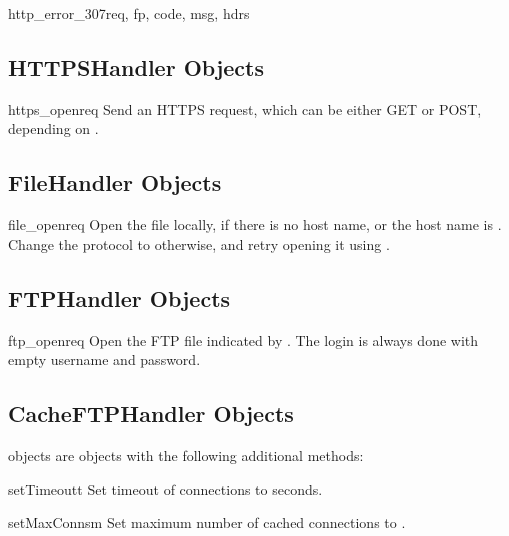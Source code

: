 \begin{methoddesc}[HTTPRedirectHandler]{http_error_307}{req,
                                                  fp, code, msg, hdrs}
\subsection{HTTPSHandler Objects \label{https-handler-objects}}

\begin{methoddesc}[HTTPSHandler]{https_open}{req}
Send an HTTPS request, which can be either GET or POST, depending on
.
\end{methoddesc}


\subsection{FileHandler Objects \label{file-handler-objects}}

\begin{methoddesc}[FileHandler]{file_open}{req}
Open the file locally, if there is no host name, or
the host name is . Change the
protocol to  otherwise, and retry opening
it using .
\end{methoddesc}


\subsection{FTPHandler Objects \label{ftp-handler-objects}}

\begin{methoddesc}[FTPHandler]{ftp_open}{req}
Open the FTP file indicated by .
The login is always done with empty username and password.
\end{methoddesc}


\subsection{CacheFTPHandler Objects \label{cacheftp-handler-objects}}

 objects are  objects with
the following additional methods:

\begin{methoddesc}[CacheFTPHandler]{setTimeout}{t}
Set timeout of connections to  seconds.
\end{methoddesc}

\begin{methoddesc}[CacheFTPHandler]{setMaxConns}{m}
Set maximum number of cached connections to .
\end{methoddesc}



\end{methoddesc}
